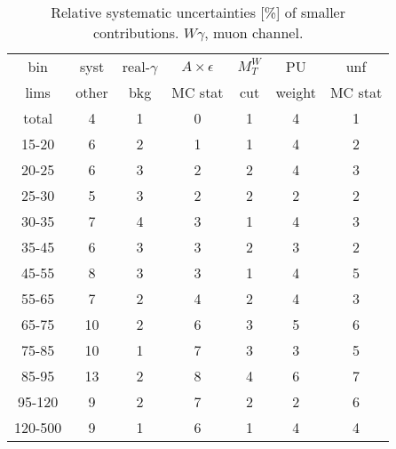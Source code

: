 \begin{table}[h]
  \scriptsize
  \begin{center}
  \caption{Relative systematic uncertainties [\%] of smaller contributions. $W\gamma$, muon channel.}
  \begin{tabular}{|c|c|c|c|c|c|c|}
    bin  & syst & real-$\gamma$ & $A\times\epsilon$ & $M_T^W$ & PU & unf\\
    lims  & other & bkg & MC stat & cut & weight & MC stat\\ \hline
    total  & 4 & 1 & 0 & 1 & 4 & 1 \\ \hline
    15-20 & 6 & 2 & 1 & 1 & 4 & 2 \\ \hline
    20-25 & 6 & 3 & 2 & 2 & 4 & 3 \\ \hline
    25-30 & 5 & 3 & 2 & 2 & 2 & 2 \\ \hline
    30-35 & 7 & 4 & 3 & 1 & 4 & 3 \\ \hline
    35-45 & 6 & 3 & 3 & 2 & 3 & 2 \\ \hline
    45-55 & 8 & 3 & 3 & 1 & 4 & 5 \\ \hline
    55-65 & 7 & 2 & 4 & 2 & 4 & 3 \\ \hline
    65-75 & 10 & 2 & 6 & 3 & 5 & 6 \\ \hline
    75-85 & 10 & 1 & 7 & 3 & 3 & 5 \\ \hline
    85-95 & 13 & 2 & 8 & 4 & 6 & 7 \\ \hline
    95-120 & 9 & 2 & 7 & 2 & 2 & 6 \\ \hline
    120-500 & 9 & 1 & 6 & 1 & 4 & 4 \\ \hline
  \end{tabular}
  \label{tab:systInPercentSmallSysts_MUON_WGamma}
  \end{center}
\end{table}

